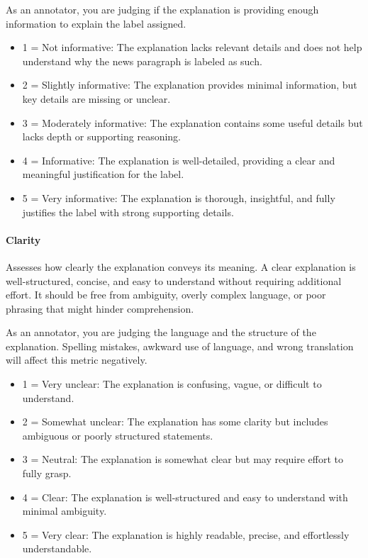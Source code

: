 As an annotator, you are judging if the explanation is providing enough information to explain the label assigned.

\begin{itemize}[noitemsep,topsep=0pt,labelsep=.5em]
    \item 1 = Not informative: The explanation lacks relevant details and does not help understand why the news paragraph is labeled as such.
    \item 2 = Slightly informative: The explanation provides minimal information, but key details are missing or unclear.
    \item 3 = Moderately informative: The explanation contains some useful details but lacks depth or supporting reasoning.
    \item 4 = Informative: The explanation is well-detailed, providing a clear and meaningful justification for the label.
    \item 5 = Very informative: The explanation is thorough, insightful, and fully justifies the label with strong supporting details.
\end{itemize}

\paragraph{Clarity}
Assesses how clearly the explanation conveys its meaning. A clear explanation is well-structured, concise, and easy to understand without requiring additional effort. It should be free from ambiguity, overly complex language, or poor phrasing that might hinder comprehension.

As an annotator, you are judging the language and the structure of the explanation. Spelling mistakes, awkward use of language, and wrong translation will affect this metric negatively.

\begin{itemize}[noitemsep,topsep=0pt,labelsep=.5em]
    \item 1 = Very unclear: The explanation is confusing, vague, or difficult to understand.
    \item 2 = Somewhat unclear: The explanation has some clarity but includes ambiguous or poorly structured statements.
    \item 3 = Neutral: The explanation is somewhat clear but may require effort to fully grasp.
    \item 4 = Clear: The explanation is well-structured and easy to understand with minimal ambiguity.
    \item 5 = Very clear: The explanation is highly readable, precise, and effortlessly understandable.
\end{itemize}

